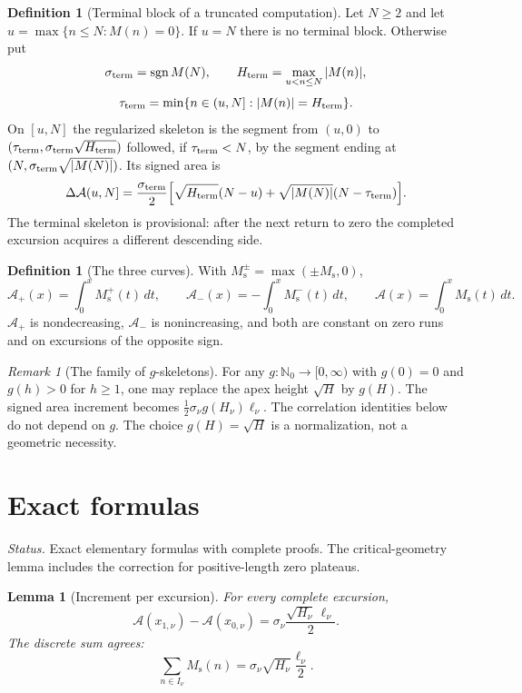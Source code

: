 \documentclass[11pt]{amsart}
\numberwithin{equation}{section}
\theoremstyle{plain}
\newtheorem{lemma}[theorem]{Lemma}
\theoremstyle{definition}
\newtheorem{definition}[theorem]{Definition}
\theoremstyle{remark}
\newtheorem{remark}[theorem]{Remark}
\DeclareMathOperator{\sgn}{sgn}
\newcommand{\Ms}{M_{\mathrm{s}}}
\newcommand{\Ap}{\mathcal{A}_{+}}
\newcommand{\Am}{\mathcal{A}_{-}}
\newcommand{\Anet}{\mathcal{A}}
\begin{document}
\begin{definition}[Terminal block of a truncated computation]
\label{def:Ms-terminal}
Let $N\ge2$ and let $u=\max\{n\le N:M(n)=0\}$.  If $u=N$ there is no
terminal block. Otherwise put
\[
\sigma_{\rm term}=\sgn M(N),\qquad
H_{\rm term}=\max_{u<n\le N}|M(n)|,
\]
\[
\tau_{\rm term}=\min\{n\in(u,N]:|M(n)|=H_{\rm term}\}.
\]
On $[u,N]$ the regularized skeleton is the segment from $(u,0)$ to
$(\tau_{\rm term},\sigma_{\rm term}\sqrt{H_{\rm term}})$ followed, if
$\tau_{\rm term}<N$, by the segment ending at
$(N,\sigma_{\rm term}\sqrt{|M(N)|})$. Its signed area is
\[
\Delta\Anet(u,N]=\frac{\sigma_{\rm term}}2
\Bigl[\sqrt{H_{\rm term}}(N-u)+
\sqrt{|M(N)|}(N-\tau_{\rm term})\Bigr].
\]
The terminal skeleton is provisional: after the next return to zero the
completed excursion acquires a different descending side.
\end{definition}

\begin{definition}[The three curves]
\label{def:areas}
With $\Ms^{\pm}=\max(\pm\Ms,0)$,
\begin{equation}
\label{eq:areas_def}
\Ap(x)=\int_0^x\Ms^+(t)\,dt,\qquad
\Am(x)=-\int_0^x\Ms^-(t)\,dt,\qquad
\Anet(x)=\int_0^x\Ms(t)\,dt.
\end{equation}
$\Ap$ is nondecreasing, $\Am$ is nonincreasing, and both are constant on
zero runs and on excursions of the opposite sign.
\end{definition}

\begin{remark}[The family of $g$-skeletons]
\label{rem:g-skeleton}
For any $g:\mathbb N_0\to[0,\infty)$ with $g(0)=0$ and $g(h)>0$ for $h\ge1$,
one may replace the apex height $\sqrt H$ by $g(H)$. The signed area increment
becomes $\tfrac12\sigma_\nu g(H_\nu)\ell_\nu$.  The correlation identities
below do not depend on $g$.  The choice $g(H)=\sqrt H$ is a normalization,
not a geometric necessity.
\end{remark}

\section{Exact formulas}
\label{sec:formulas}

\noindent\emph{Status.} Exact elementary formulas with complete proofs.  The
critical-geometry lemma includes the correction for positive-length zero
plateaus.

\begin{lemma}[Increment per excursion]
\label{lem:jump}
For every complete excursion,
\begin{equation}
\label{eq:jump}
\Anet(x_{1,\nu})-\Anet(x_{0,\nu})
=\sigma_\nu\frac{\sqrt{H_\nu}\,\ell_\nu}{2}.
\end{equation}
The discrete sum agrees:
\begin{equation}
\label{eq:jump_discrete}
\sum_{n\in I_\nu}\Ms(n)
=\sigma_\nu\sqrt{H_\nu}\frac{\ell_\nu}{2}.
\end{equation}
\end{lemma}
\end{document}
